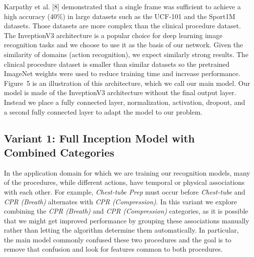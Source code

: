 \documentclass[letterpaper, 10 pt, conference]{ieeeconf}  %
\newcommand{\bbc}[1]{\textcolor{blue}{(Bobby: #1)}}
\newcommand{\lingfeng}[1]{\textcolor{orange}{(Lingfeng: #1)}}
\newcommand{\rap}[1]{\textcolor{red}{(Richard: #1)}}
\begin{document}
Karpathy et al. [8] demonstrated that a single frame was sufficient to achieve a high accuracy (40\%) in large datasets such as the UCF-101 and the Sport1M datasets. Those datasets are more complex than the clinical procedure dataset. The InveptionV3 architecture is a popular choice for deep learning image recognition tasks and we choose to use it as the basis of our network. Given the similarity of domains (action recognition), we expect similarly strong results. The clinical procedure dataset is smaller than similar datasets so the pretrained ImageNet weights were used to reduce training time and increase performance. Figure~5 is an illustration of this architecture, which we call our main model. Our model is made of the InveptionV3 architecture without the final output layer. Instead we place a fully connected layer, normalization, activation, dropout, and a second fully connected layer to adapt the model to our problem.


\subsection{Variant 1: Full Inception Model with Combined Categories}\label{sec:variant1}

In the application domain for which we are training our recognition models, many
 of the procedures, while different actions, have temporal or physical associations with each other. For example, \textit{Chest-tube Prep} must occur before \textit{Chest-tube} and \textit{CPR (Breath)} alternates with \textit{CPR (Compression)}. In this variant we explore combining the \textit{CPR (Breath)} and \textit{CPR (Compression)} categories, as it is possible that we might get improved performance by grouping these associations manually rather than letting the algorithm determine them automatically.  In particular, the main model commonly confused these two procedures and the goal is to remove that confusion and look for features common to both procedures.
\end{document}
